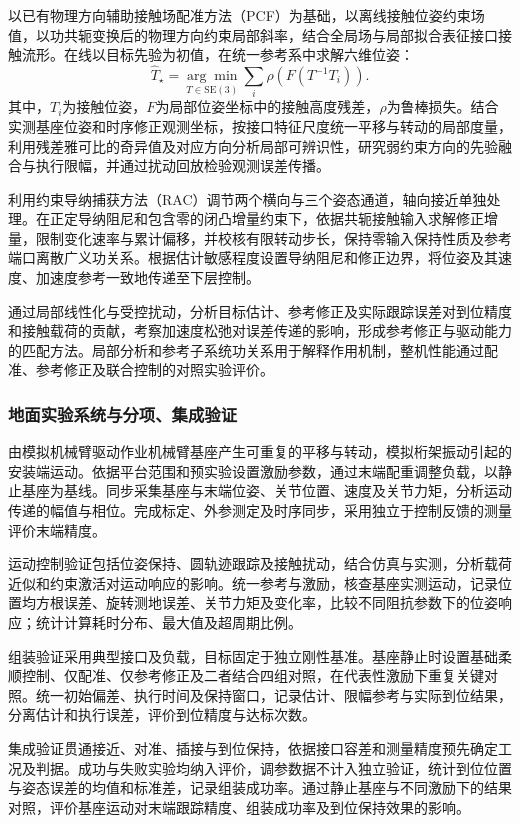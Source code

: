 \documentclass[UTF8,a4paper,zihao=-4,fontset=fandol]{ctexart}
\newcommand{\SE}{\mathrm{SE}(3)}
\begin{document}
以已有物理方向辅助接触场配准方法（PCF）为基础，以离线接触位姿约束场值，以功共轭变换后的物理方向约束局部斜率，结合全局场与局部拟合表征接口接触流形。在线以目标先验为初值，在统一参考系中求解六维位姿：
\begin{equation}
 \widehat T_\star=\underset{T\in\SE}{\arg\min}
 \sum_i\rho\!\left(F(T^{-1}T_i)\right).
 \label{eq:registration}
\end{equation}
其中，$T_i$为接触位姿，$F$为局部位姿坐标中的接触高度残差，$\rho$为鲁棒损失。结合实测基座位姿和时序修正观测坐标，按接口特征尺度统一平移与转动的局部度量，利用残差雅可比的奇异值及对应方向分析局部可辨识性，研究弱约束方向的先验融合与执行限幅，并通过扰动回放检验观测误差传播。

利用约束导纳捕获方法（RAC）调节两个横向与三个姿态通道，轴向接近单独处理。在正定导纳阻尼和包含零的闭凸增量约束下，依据共轭接触输入求解修正增量，限制变化速率与累计偏移，并校核有限转动步长，保持零输入保持性质及参考端口离散广义功关系。根据估计敏感程度设置导纳阻尼和修正边界，将位姿及其速度、加速度参考一致地传递至下层控制。

通过局部线性化与受控扰动，分析目标估计、参考修正及实际跟踪误差对到位精度和接触载荷的贡献，考察加速度松弛对误差传递的影响，形成参考修正与驱动能力的匹配方法。局部分析和参考子系统功关系用于解释作用机制，整机性能通过配准、参考修正及联合控制的对照实验评价。

\subsubsection{地面实验系统与分项、集成验证}

由模拟机械臂驱动作业机械臂基座产生可重复的平移与转动，模拟桁架振动引起的安装端运动。依据平台范围和预实验设置激励参数，通过末端配重调整负载，以静止基座为基线。同步采集基座与末端位姿、关节位置、速度及关节力矩，分析运动传递的幅值与相位。完成标定、外参测定及时序同步，采用独立于控制反馈的测量评价末端精度。

运动控制验证包括位姿保持、圆轨迹跟踪及接触扰动，结合仿真与实测，分析载荷近似和约束激活对运动响应的影响。统一参考与激励，核查基座实测运动，记录位置均方根误差、旋转测地误差、关节力矩及变化率，比较不同阻抗参数下的位姿响应；统计计算耗时分布、最大值及超周期比例。

组装验证采用典型接口及负载，目标固定于独立刚性基准。基座静止时设置基础柔顺控制、仅配准、仅参考修正及二者结合四组对照，在代表性激励下重复关键对照。统一初始偏差、执行时间及保持窗口，记录估计、限幅参考与实际到位结果，分离估计和执行误差，评价到位精度与达标次数。

集成验证贯通接近、对准、插接与到位保持，依据接口容差和测量精度预先确定工况及判据。成功与失败实验均纳入评价，调参数据不计入独立验证，统计到位位置与姿态误差的均值和标准差，记录组装成功率。通过静止基座与不同激励下的结果对照，评价基座运动对末端跟踪精度、组装成功率及到位保持效果的影响。
\end{document}
